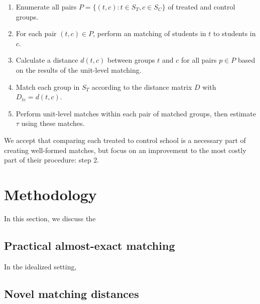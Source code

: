 \documentclass[aoas]{imsart}
\theoremstyle{plain}
\theoremstyle{definition}
\begin{document}
\begin{enumerate}
  \item Enumerate all pairs $P = \{(t, c) : t\in S_T , c\in S_C\}$ of treated and control groups.
  \item For each pair $(t, c) \in P$, perform an matching of students in $t$ to students in $c$.
  \item Calculate a distance $d(t, c)$ between groups $t$ and $c$ for all pairs $p\in P$ based on the results of the unit-level matching.
  \item Match each group in $S_T$ according to the distance matrix $D$ with $D_{tc} = d(t,c)$.
  \item Perform unit-level matches within each pair of matched groups, then estimate $\tau$ using these matches.
\end{enumerate}

We accept that comparing each treated to control school is a necessary part of creating well-formed matches, but focus on an improvement to the most costly part of their procedure: step 2.


\section{Methodology}
In this section, we discuss the 


\subsection{Practical almost-exact matching}

In the idealized setting, 



\subsection{Novel matching distances}
\end{document}
